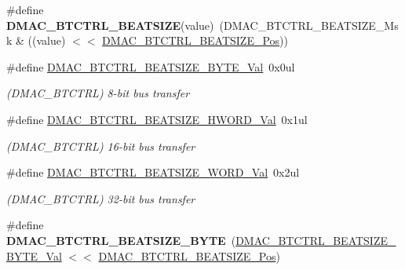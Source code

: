 \begin{DoxyCompactItemize}
\item 
\hypertarget{group___s_a_m_l21___d_m_a_c_gaaa064d90101faeea6f9c17ba2c7b139c}{}\#define {\bfseries D\+M\+A\+C\+\_\+\+B\+T\+C\+T\+R\+L\+\_\+\+B\+E\+A\+T\+S\+I\+Z\+E}(value)~(D\+M\+A\+C\+\_\+\+B\+T\+C\+T\+R\+L\+\_\+\+B\+E\+A\+T\+S\+I\+Z\+E\+\_\+\+Msk \& ((value) $<$$<$ \hyperlink{group___s_a_m_l21___d_m_a_c_ga4961493aedfe85b741e91f8370b9586c}{D\+M\+A\+C\+\_\+\+B\+T\+C\+T\+R\+L\+\_\+\+B\+E\+A\+T\+S\+I\+Z\+E\+\_\+\+Pos}))\label{group___s_a_m_l21___d_m_a_c_gaaa064d90101faeea6f9c17ba2c7b139c}

\item 
\hypertarget{group___s_a_m_l21___d_m_a_c_gaf6172f239bfecdded8cc118f3a5ac687}{}\#define \hyperlink{group___s_a_m_l21___d_m_a_c_gaf6172f239bfecdded8cc118f3a5ac687}{D\+M\+A\+C\+\_\+\+B\+T\+C\+T\+R\+L\+\_\+\+B\+E\+A\+T\+S\+I\+Z\+E\+\_\+\+B\+Y\+T\+E\+\_\+\+Val}~0x0ul\label{group___s_a_m_l21___d_m_a_c_gaf6172f239bfecdded8cc118f3a5ac687}

\begin{DoxyCompactList}\small\item\em (D\+M\+A\+C\+\_\+\+B\+T\+C\+T\+R\+L) 8-\/bit bus transfer \end{DoxyCompactList}\item 
\hypertarget{group___s_a_m_l21___d_m_a_c_ga2f763ae7b69389c853910c3486543e84}{}\#define \hyperlink{group___s_a_m_l21___d_m_a_c_ga2f763ae7b69389c853910c3486543e84}{D\+M\+A\+C\+\_\+\+B\+T\+C\+T\+R\+L\+\_\+\+B\+E\+A\+T\+S\+I\+Z\+E\+\_\+\+H\+W\+O\+R\+D\+\_\+\+Val}~0x1ul\label{group___s_a_m_l21___d_m_a_c_ga2f763ae7b69389c853910c3486543e84}

\begin{DoxyCompactList}\small\item\em (D\+M\+A\+C\+\_\+\+B\+T\+C\+T\+R\+L) 16-\/bit bus transfer \end{DoxyCompactList}\item 
\hypertarget{group___s_a_m_l21___d_m_a_c_ga17adb4e5668571563f3f60743b7d0d4e}{}\#define \hyperlink{group___s_a_m_l21___d_m_a_c_ga17adb4e5668571563f3f60743b7d0d4e}{D\+M\+A\+C\+\_\+\+B\+T\+C\+T\+R\+L\+\_\+\+B\+E\+A\+T\+S\+I\+Z\+E\+\_\+\+W\+O\+R\+D\+\_\+\+Val}~0x2ul\label{group___s_a_m_l21___d_m_a_c_ga17adb4e5668571563f3f60743b7d0d4e}

\begin{DoxyCompactList}\small\item\em (D\+M\+A\+C\+\_\+\+B\+T\+C\+T\+R\+L) 32-\/bit bus transfer \end{DoxyCompactList}\item 
\hypertarget{group___s_a_m_l21___d_m_a_c_ga96d0898f8d8c76aa6a47dc2e8312cdd2}{}\#define {\bfseries D\+M\+A\+C\+\_\+\+B\+T\+C\+T\+R\+L\+\_\+\+B\+E\+A\+T\+S\+I\+Z\+E\+\_\+\+B\+Y\+T\+E}~(\hyperlink{group___s_a_m_l21___d_m_a_c_gaf6172f239bfecdded8cc118f3a5ac687}{D\+M\+A\+C\+\_\+\+B\+T\+C\+T\+R\+L\+\_\+\+B\+E\+A\+T\+S\+I\+Z\+E\+\_\+\+B\+Y\+T\+E\+\_\+\+Val} $<$$<$ \hyperlink{group___s_a_m_l21___d_m_a_c_ga4961493aedfe85b741e91f8370b9586c}{D\+M\+A\+C\+\_\+\+B\+T\+C\+T\+R\+L\+\_\+\+B\+E\+A\+T\+S\+I\+Z\+E\+\_\+\+Pos})\label{group___s_a_m_l21___d_m_a_c_ga96d0898f8d8c76aa6a47dc2e8312cdd2}


\end{DoxyCompactItemize}
